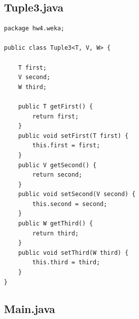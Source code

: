 \subsection{Tuple3.java}

\begin{lstlisting}
package hw4.weka;

public class Tuple3<T, V, W> {

	T first;
	V second;
	W third;
	
	public T getFirst() {
		return first;
	}
	public void setFirst(T first) {
		this.first = first;
	}
	public V getSecond() {
		return second;
	}
	public void setSecond(V second) {
		this.second = second;
	}
	public W getThird() {
		return third;
	}
	public void setThird(W third) {
		this.third = third;
	}	
}
\end{lstlisting}

\subsection{Main.java}


